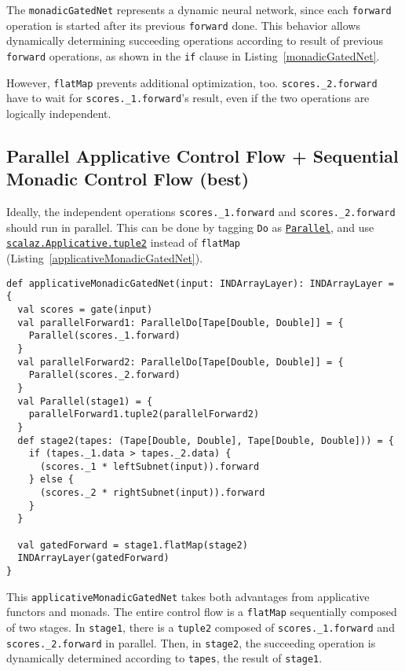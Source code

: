 The \lstinline{monadicGatedNet} represents a dynamic neural network, since each \lstinline{forward} operation is started after its previous \lstinline{forward} done. This behavior allows dynamically determining succeeding operations according to result of previous \lstinline{forward} operations, as shown in the \lstinline{if} clause in Listing~\ref{monadicGatedNet}.

However, \lstinline{flatMap} prevents additional optimization, too.
\lstinline{scores._2.forward} have to wait for \lstinline{scores._1.forward}'s result, even if the two operations are logically independent.

\subsection{Parallel Applicative Control Flow + Sequential Monadic Control Flow (best)}
\label{applicative}

Ideally, the independent operations \lstinline{scores._1.forward} and \lstinline{scores._2.forward} should run in parallel. This can be done by tagging \lstinline{Do} as \href{https://javadoc.io/page/org.scalaz/scalaz_2.11/latest/scalaz/Tags%24%24Parallel.html}{\lstinline{Parallel}}, and use \href{https://javadoc.io/page/org.scalaz/scalaz_2.11/latest/scalaz/Applicative.html#tuple2[A,B](fa:=>F[A],fb:=>F[B]):F[(A,B)]}{\lstinline{scalaz.Applicative.tuple2}} instead of \lstinline{flatMap} (Listing~\ref{applicativeMonadicGatedNet}).

\begin{lstlisting}[float={h t b p},caption={Applicative + monadic gated network}, label={applicativeMonadicGatedNet}]
def applicativeMonadicGatedNet(input: INDArrayLayer): INDArrayLayer = {
  val scores = gate(input)
  val parallelForward1: ParallelDo[Tape[Double, Double]] = {
    Parallel(scores._1.forward)
  }
  val parallelForward2: ParallelDo[Tape[Double, Double]] = {
    Parallel(scores._2.forward)
  }
  val Parallel(stage1) = {
  	parallelForward1.tuple2(parallelForward2)
  }
  def stage2(tapes: (Tape[Double, Double], Tape[Double, Double])) = {
    if (tapes._1.data > tapes._2.data) {
      (scores._1 * leftSubnet(input)).forward
    } else {
      (scores._2 * rightSubnet(input)).forward
    }
  }

  val gatedForward = stage1.flatMap(stage2)
  INDArrayLayer(gatedForward)
}
\end{lstlisting}

This \lstinline{applicativeMonadicGatedNet} takes both advantages from applicative functors and monads. The entire control flow is a \lstinline{flatMap} sequentially composed of two stages. In \lstinline{stage1}, there is a \lstinline{tuple2} composed of \lstinline{scores._1.forward} and \lstinline{scores._2.forward} in parallel. Then, in \lstinline{stage2}, the succeeding operation is dynamically determined according to \lstinline{tapes}, the result of \lstinline{stage1}.

